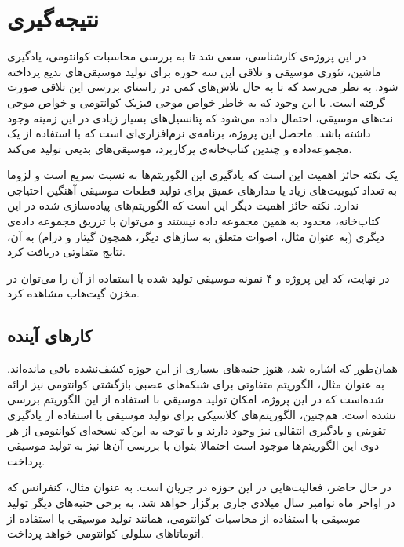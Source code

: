 \chapter{نتیجه‌گیری}

در این پروژه‌ی کارشناسی، سعی شد تا به بررسی محاسبات کوانتومی، یادگیری ماشین، تئوری موسیقی و تلاقی این سه حوزه برای تولید موسیقی‌های بدیع پرداخته شود. به نظر می‌رسد که تا به حال تلاش‌های کمی در راستای بررسی این تلاقی صورت گرفته است. با این وجود که به خاطر خواص موجی فیزیک کوانتومی و خواص موجی نت‌های موسیقی، احتمال داده می‌شود که پتانسیل‌های بسیار زیادی در این زمینه وجود داشته باشد.
ماحصل این پروژه، برنامه‌ی نرم‌افزاری‌ای است که با استفاده از یک مجموعه‌داده و چندین کتاب‌خانه‌ی پرکاربرد، موسیقی‌های بدیعی تولید می‌کند.

یک نکته حائز اهمیت این است که یادگیری این الگوریتم‌ها به نسبت سریع است و لزوما به تعداد کیوبیت‌های زیاد یا مدارهای عمیق برای تولید قطعات موسیقی آهنگین احتیاجی ندارد.
نکته حائز اهمیت دیگر این است که الگوریتم‌های پیاده‌سازی شده در این کتاب‌خانه، محدود به همین مجموعه داده نیستند و می‌توان با تزریق مجموعه داده‌ی دیگری (به عنوان مثال، اصوات متعلق به سازهای دیگر، همچون گیتار و درام) به آن، نتایج متفاوتی دریافت کرد.

در نهایت، کد این پروژه و ۴ نمونه موسیقی تولید شده با استفاده از آن را می‌توان در مخزن گیت‌هاب
\cite{Maqenta}
مشاهده کرد.

\section{کارهای آینده}
همان‌طور که اشاره شد، هنوز جنبه‌های بسیاری از این حوزه کشف‌نشده باقی مانده‌اند. به عنوان مثال، الگوریتم متفاوتی
\cite{bausch2020recurrent}
برای شبکه‌های عصبی بازگشتی کوانتومی نیز ارائه شده‌است که در این پروژه، امکان تولید موسیقی با استفاده از این الگوریتم بررسی نشده است. هم‌چنین، الگوریتم‌های کلاسیکی برای تولید موسیقی با استفاده از یادگیری تقویتی
و یادگیری انتقالی
نیز وجود دارند و با توجه به این‌که نسخه‌ای کوانتومی از هر دوی این الگوریتم‌ها موجود است
\cite{Mari_qtransfer}
\cite{Daoyi_QReinforce}
احتمالا بتوان با بررسی آن‌ها نیز به تولید موسیقی پرداخت.

در حال حاضر، فعالیت‌هایی در این حوزه در جریان است. به عنوان مثال، کنفرانس
\cite{ISQCMC}
که در اواخر ماه نوامبر سال میلادی جاری برگزار خواهد شد، به برخی جنبه‌های دیگر تولید موسیقی با استفاده از محاسبات کوانتومی، همانند
تولید موسیقی با استفاده از اتوماتاهای سلولی کوانتومی
خواهد پرداخت.
